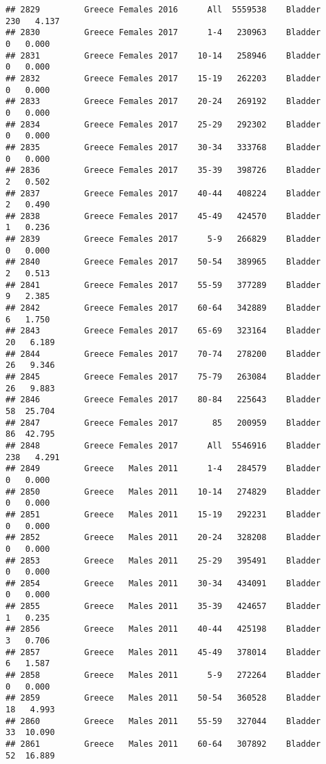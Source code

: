 \documentclass[
]{article}
\begin{document}
\begin{verbatim}
## 2829         Greece Females 2016      All  5559538    Bladder    230   4.137
## 2830         Greece Females 2017      1-4   230963    Bladder      0   0.000
## 2831         Greece Females 2017    10-14   258946    Bladder      0   0.000
## 2832         Greece Females 2017    15-19   262203    Bladder      0   0.000
## 2833         Greece Females 2017    20-24   269192    Bladder      0   0.000
## 2834         Greece Females 2017    25-29   292302    Bladder      0   0.000
## 2835         Greece Females 2017    30-34   333768    Bladder      0   0.000
## 2836         Greece Females 2017    35-39   398726    Bladder      2   0.502
## 2837         Greece Females 2017    40-44   408224    Bladder      2   0.490
## 2838         Greece Females 2017    45-49   424570    Bladder      1   0.236
## 2839         Greece Females 2017      5-9   266829    Bladder      0   0.000
## 2840         Greece Females 2017    50-54   389965    Bladder      2   0.513
## 2841         Greece Females 2017    55-59   377289    Bladder      9   2.385
## 2842         Greece Females 2017    60-64   342889    Bladder      6   1.750
## 2843         Greece Females 2017    65-69   323164    Bladder     20   6.189
## 2844         Greece Females 2017    70-74   278200    Bladder     26   9.346
## 2845         Greece Females 2017    75-79   263084    Bladder     26   9.883
## 2846         Greece Females 2017    80-84   225643    Bladder     58  25.704
## 2847         Greece Females 2017       85   200959    Bladder     86  42.795
## 2848         Greece Females 2017      All  5546916    Bladder    238   4.291
## 2849         Greece   Males 2011      1-4   284579    Bladder      0   0.000
## 2850         Greece   Males 2011    10-14   274829    Bladder      0   0.000
## 2851         Greece   Males 2011    15-19   292231    Bladder      0   0.000
## 2852         Greece   Males 2011    20-24   328208    Bladder      0   0.000
## 2853         Greece   Males 2011    25-29   395491    Bladder      0   0.000
## 2854         Greece   Males 2011    30-34   434091    Bladder      0   0.000
## 2855         Greece   Males 2011    35-39   424657    Bladder      1   0.235
## 2856         Greece   Males 2011    40-44   425198    Bladder      3   0.706
## 2857         Greece   Males 2011    45-49   378014    Bladder      6   1.587
## 2858         Greece   Males 2011      5-9   272264    Bladder      0   0.000
## 2859         Greece   Males 2011    50-54   360528    Bladder     18   4.993
## 2860         Greece   Males 2011    55-59   327044    Bladder     33  10.090
## 2861         Greece   Males 2011    60-64   307892    Bladder     52  16.889

\end{verbatim}
\end{document}
